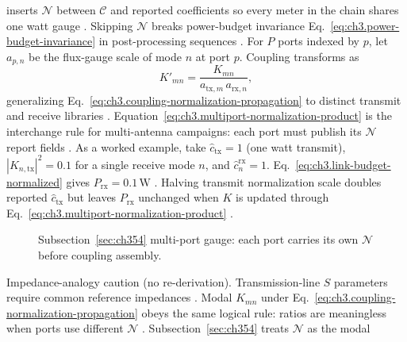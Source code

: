 inserts \(\mathcal{N}\) between \(\mathcal{C}\) and reported coefficients so every meter in the chain shares one watt gauge
\cite{harrington2001}. Skipping \(\mathcal{N}\) breaks power-budget invariance
Eq.~\eqref{eq:ch3.power-budget-invariance} in post-processing sequences \cite{harrington2001}.
For \(P\) ports indexed by \(p\), let \(a_{p,n}\) be the flux-gauge scale of mode \(n\) at port \(p\). Coupling transforms as
\begin{equation}
\label{eq:ch3.multiport-normalization-product}
K'_{mn}
=
\frac{K_{mn}}{a_{\mathrm{tx},m}\,a_{\mathrm{rx},n}},
\end{equation}
generalizing Eq.~\eqref{eq:ch3.coupling-normalization-propagation} to distinct transmit and receive libraries
\cite{harrington2001}. Equation~\eqref{eq:ch3.multiport-normalization-product} is the interchange rule for
multi-antenna campaigns: each port must publish its \(\mathcal{N}\) report fields \cite{hansen1988}.
As a worked example, take \(\widehat{c}_{\mathrm{tx}}=1\) (one watt transmit), \(|K_{n,\mathrm{tx}}|^{2}=0.1\) for a single receive mode \(n\), and
\(\widehat{c}_{n}^{\mathrm{rx}}=1\). Eq.~\eqref{eq:ch3.link-budget-normalized} gives \(P_{\mathrm{rx}}=0.1\,\mathrm{W}\)
\cite{harrington2001}. Halving transmit normalization scale doubles reported \(\widehat{c}_{\mathrm{tx}}\)
but leaves \(P_{\mathrm{rx}}\) unchanged when \(K\) is updated through Eq.~\eqref{eq:ch3.multiport-normalization-product}
\cite{harrington2001}.
\begin{figure}[t]
\centering
{}
\caption{Subsection~\ref{sec:ch354} multi-port gauge: each port carries its own \(\mathcal{N}\) before coupling assembly.}
\label{fig:ch3.354-multiport-gauge}
\end{figure}
Impedance-analogy caution (no re-derivation). Transmission-line \(S\) parameters require common reference impedances \cite{harrington2001}. Modal \(K_{mn}\) under
Eq.~\eqref{eq:ch3.coupling-normalization-propagation} obeys the same logical rule: ratios are meaningless when ports use
different \(\mathcal{N}\) \cite{stratton1941}. Subsection~\ref{sec:ch354} treats \(\mathcal{N}\) as the modal
